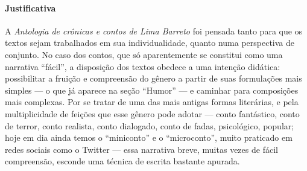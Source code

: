 \documentclass{extarticle}
\begin{document}

\paragraph{Justificativa} A \emph{Antologia de crônicas e contos de Lima
Barreto} foi pensada tanto para que os textos sejam trabalhados em sua
individualidade, quanto numa perspectiva de conjunto. No caso dos
contos, que só aparentemente se constitui como uma narrativa ``fácil'',
a disposição dos textos obedece a uma intenção didática: possibilitar a
fruição e compreensão do gênero a partir de suas formulações mais
simples --- o que já aparece na seção ``Humor'' --- e caminhar para
composições mais complexas. Por se tratar de uma das mais antigas formas
literárias, e pela multiplicidade de feições que esse gênero pode adotar
--- conto fantástico, conto de terror, conto realista, conto dialogado,
conto de fadas, psicológico, popular; hoje em dia ainda temos o
``miniconto'' e o ``microconto'', muito praticado em redes sociais como
o Twitter --- essa narrativa breve, muitas vezes de fácil compreensão,
esconde uma técnica de escrita bastante apurada.
\end{document}
